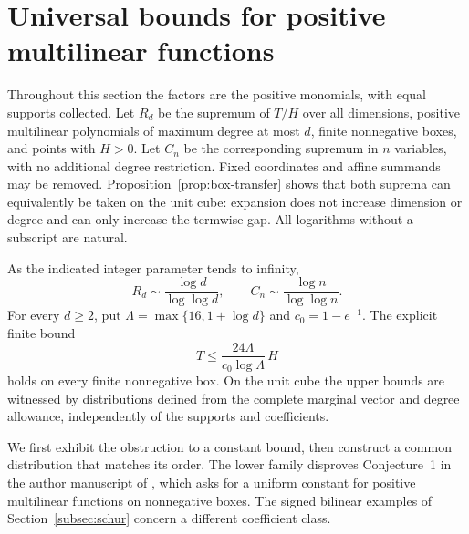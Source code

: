 \section{Universal bounds for positive multilinear functions}
\label{sec:positive-universal}
Throughout this section the factors are the positive monomials, with equal
supports collected. Let $R_d$ be the supremum of $T/H$ over all dimensions,
positive multilinear polynomials of maximum degree at most $d$, finite
nonnegative boxes, and points with $H>0$. Let $C_n$ be the corresponding
supremum in $n$ variables, with no additional degree restriction. Fixed
coordinates and affine summands may be removed. Proposition~\ref{prop:box-transfer}
shows that both suprema can equivalently be taken on the unit cube: expansion
does not increase dimension or degree and can only increase the termwise gap.
All logarithms without a subscript are natural.

\begin{theorem}\label{thm:positive-growth}
As the indicated integer parameter tends to infinity,
\begin{equation}\label{eq:positive-growth}
 R_d\sim\frac{\log d}{\log\log d},\qquad
 C_n\sim\frac{\log n}{\log\log n}.
\end{equation}
For every $d\ge2$, put $\Lambda=\max\{16,1+\log d\}$ and $c_0=1-e^{-1}$.
The explicit finite bound
\begin{equation}\label{eq:original-harmonic-finite}
 T\le\frac{24\Lambda}{c_0\log\Lambda}\,H
\end{equation}
holds on every finite nonnegative box. On the unit cube the upper bounds
are witnessed by distributions defined from the complete marginal vector
and degree allowance, independently of the supports and coefficients.
\end{theorem}

We first exhibit the obstruction to a constant bound, then construct a
common distribution that matches its order. The lower family disproves
Conjecture~1 in the author manuscript of \citet[p.~22]{Luedtke2012}, which
asks for a uniform constant for positive multilinear functions on
nonnegative boxes. The signed bilinear examples of Section~\ref{subsec:schur}
concern a different coefficient class.

